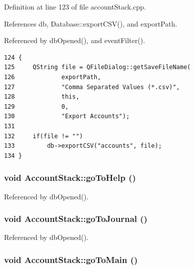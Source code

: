 Definition at line 123 of file account\-Stack.cpp.

References db, Database::export\-CSV(), and export\-Path.

Referenced by db\-Opened(), and event\-Filter().

\footnotesize\begin{verbatim}124 {
125     QString file = QFileDialog::getSaveFileName(
126             exportPath,
127             "Comma Separated Values (*.csv)",
128             this,
129             0,
130             "Export Accounts");
131 
132     if(file != "")
133         db->exportCSV("accounts", file);
134 }
\end{verbatim}\normalsize 


\hypertarget{classAccountStack_l3}{
\subsubsection[goToHelp]{\setlength{\rightskip}{0pt plus 5cm}void Account\-Stack::go\-To\-Help ()}}
\label{classAccountStack_l3}




Referenced by db\-Opened().\hypertarget{classAccountStack_l1}{
\subsubsection[goToJournal]{\setlength{\rightskip}{0pt plus 5cm}void Account\-Stack::go\-To\-Journal ()}}
\label{classAccountStack_l1}




Referenced by db\-Opened().\hypertarget{classAccountStack_l0}{
\subsubsection[goToMain]{\setlength{\rightskip}{0pt plus 5cm}void Account\-Stack::go\-To\-Main ()}}
\label{classAccountStack_l0}




